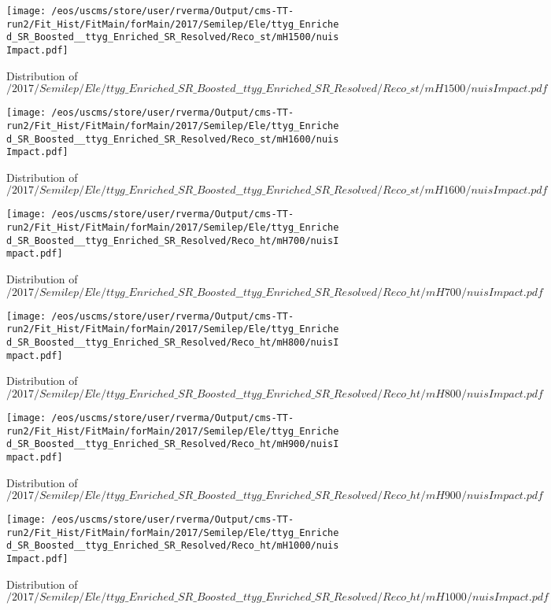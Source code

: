 \begin{figure}
\centering
\texttt{[image: /eos/uscms/store/user/rverma/Output/cms-TT-run2/Fit\_Hist/FitMain/forMain/2017/Semilep/Ele/ttyg\_Enriched\_SR\_Boosted\_\_ttyg\_Enriched\_SR\_Resolved/Reco\_st/mH1500/nuisImpact.pdf]}
\caption{Distribution of $/2017/Semilep/Ele/ttyg\_Enriched\_SR\_Boosted\_\_ttyg\_Enriched\_SR\_Resolved/Reco\_st/mH1500/nuisImpact.pdf$}
\end{figure}

\begin{figure}
\centering
\texttt{[image: /eos/uscms/store/user/rverma/Output/cms-TT-run2/Fit\_Hist/FitMain/forMain/2017/Semilep/Ele/ttyg\_Enriched\_SR\_Boosted\_\_ttyg\_Enriched\_SR\_Resolved/Reco\_st/mH1600/nuisImpact.pdf]}
\caption{Distribution of $/2017/Semilep/Ele/ttyg\_Enriched\_SR\_Boosted\_\_ttyg\_Enriched\_SR\_Resolved/Reco\_st/mH1600/nuisImpact.pdf$}
\end{figure}

\begin{figure}
\centering
\texttt{[image: /eos/uscms/store/user/rverma/Output/cms-TT-run2/Fit\_Hist/FitMain/forMain/2017/Semilep/Ele/ttyg\_Enriched\_SR\_Boosted\_\_ttyg\_Enriched\_SR\_Resolved/Reco\_ht/mH700/nuisImpact.pdf]}
\caption{Distribution of $/2017/Semilep/Ele/ttyg\_Enriched\_SR\_Boosted\_\_ttyg\_Enriched\_SR\_Resolved/Reco\_ht/mH700/nuisImpact.pdf$}
\end{figure}

\begin{figure}
\centering
\texttt{[image: /eos/uscms/store/user/rverma/Output/cms-TT-run2/Fit\_Hist/FitMain/forMain/2017/Semilep/Ele/ttyg\_Enriched\_SR\_Boosted\_\_ttyg\_Enriched\_SR\_Resolved/Reco\_ht/mH800/nuisImpact.pdf]}
\caption{Distribution of $/2017/Semilep/Ele/ttyg\_Enriched\_SR\_Boosted\_\_ttyg\_Enriched\_SR\_Resolved/Reco\_ht/mH800/nuisImpact.pdf$}
\end{figure}

\begin{figure}
\centering
\texttt{[image: /eos/uscms/store/user/rverma/Output/cms-TT-run2/Fit\_Hist/FitMain/forMain/2017/Semilep/Ele/ttyg\_Enriched\_SR\_Boosted\_\_ttyg\_Enriched\_SR\_Resolved/Reco\_ht/mH900/nuisImpact.pdf]}
\caption{Distribution of $/2017/Semilep/Ele/ttyg\_Enriched\_SR\_Boosted\_\_ttyg\_Enriched\_SR\_Resolved/Reco\_ht/mH900/nuisImpact.pdf$}
\end{figure}

\begin{figure}
\centering
\texttt{[image: /eos/uscms/store/user/rverma/Output/cms-TT-run2/Fit\_Hist/FitMain/forMain/2017/Semilep/Ele/ttyg\_Enriched\_SR\_Boosted\_\_ttyg\_Enriched\_SR\_Resolved/Reco\_ht/mH1000/nuisImpact.pdf]}
\caption{Distribution of $/2017/Semilep/Ele/ttyg\_Enriched\_SR\_Boosted\_\_ttyg\_Enriched\_SR\_Resolved/Reco\_ht/mH1000/nuisImpact.pdf$}
\end{figure}

